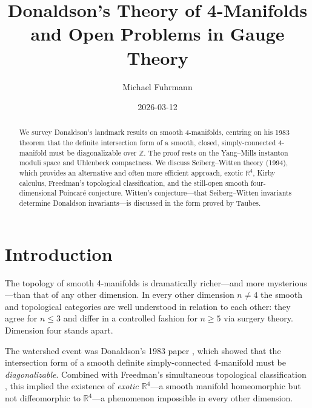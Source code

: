 \documentclass[12pt,a4paper]{amsart}
\theoremstyle{definition}
\theoremstyle{remark}
\newcommand{\ZZ}{\mathbb{Z}}
\newcommand{\RR}{\mathbb{R}}
\begin{document}
\begin{abstract}
We survey Donaldson's landmark results on smooth 4-manifolds, centring on
his 1983 theorem that the definite intersection form of a smooth, closed,
simply-connected 4-manifold must be diagonalizable over $\ZZ$.  The proof
rests on the Yang--Mills instanton moduli space and Uhlenbeck compactness.
We discuss Seiberg--Witten theory (1994), which provides an alternative and
often more efficient approach, exotic $\RR^4$, Kirby calculus, Freedman's
topological classification, and the still-open smooth four-dimensional
Poincaré conjecture.  Witten's conjecture---that Seiberg--Witten invariants
determine Donaldson invariants---is discussed in the form proved by Taubes.
\end{abstract}

\title{Donaldson's Theory of 4-Manifolds\\
\large and Open Problems in Gauge Theory}

\author{Michael Fuhrmann}
\address{Specialist Mathematics Project, Build 169}
\date{2026-03-12}

\maketitle
\tableofcontents

\section{Introduction}

The topology of smooth 4-manifolds is dramatically richer---and more
mysterious---than that of any other dimension.  In every other dimension
$n \neq 4$ the smooth and topological categories are well understood in
relation to each other: they agree for $n \le 3$ and differ in a
controlled fashion for $n \ge 5$ via surgery theory.  Dimension four
stands apart.

The watershed event was Donaldson's 1983 paper \cite{Donaldson1983}, which
showed that the intersection form of a smooth definite simply-connected
4-manifold must be \emph{diagonalizable}.  Combined with Freedman's
simultaneous topological classification \cite{Freedman1982}, this implied
the existence of \emph{exotic $\RR^4$}---a smooth manifold homeomorphic but
not diffeomorphic to $\RR^4$---a phenomenon impossible in every other
dimension.
\end{document}
